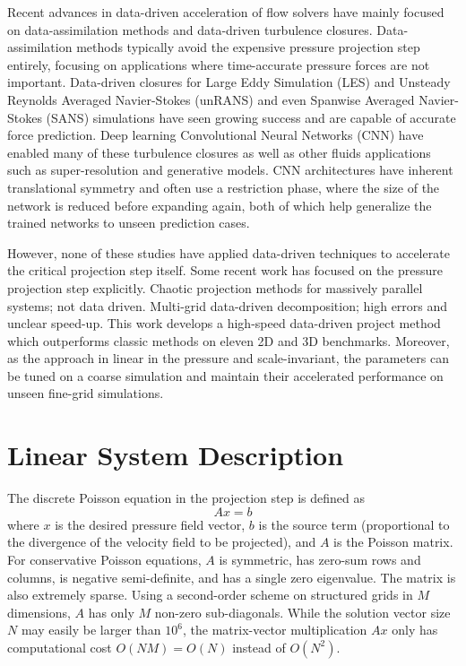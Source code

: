 \documentclass[review]{elsarticle}
\begin{document}
Recent advances in data-driven acceleration of flow solvers have mainly focused on data-assimilation methods and data-driven turbulence closures. Data-assimilation methods typically avoid the expensive pressure projection step entirely, focusing on applications where time-accurate pressure forces are not important. Data-driven closures for Large Eddy Simulation (LES) and Unsteady Reynolds Averaged Navier-Stokes (unRANS) and even Spanwise Averaged Navier-Stokes (SANS) simulations have seen growing success and are capable of accurate force prediction. Deep learning Convolutional Neural Networks (CNN) have enabled many of these turbulence closures as well as other fluids applications such as super-resolution and generative models. CNN architectures have inherent translational symmetry and often use a restriction phase, where the size of the network is reduced before expanding again, both of which help generalize the trained networks to unseen prediction cases. 

However, none of these studies have applied data-driven techniques to accelerate the critical projection step itself. Some recent work has focused on the pressure projection step explicitly. Chaotic projection methods for massively parallel systems; not data driven. Multi-grid data-driven decomposition; high errors and unclear speed-up. This work develops a high-speed data-driven project method which outperforms classic methods on eleven 2D and 3D benchmarks. Moreover, as the approach in linear in the pressure and scale-invariant, the parameters can be tuned on a coarse simulation and maintain their accelerated performance on unseen fine-grid simulations. 

\section{Linear System Description}

The discrete Poisson equation in the projection step is defined as
\begin{equation}\label{eq:axb}
    A x = b
\end{equation}
where $x$ is the desired pressure field vector, $b$ is the source term (proportional to the divergence of the velocity field to be projected), and $A$ is the Poisson matrix. For conservative Poisson equations, $A$ is symmetric, has zero-sum rows and columns, is negative semi-definite, and has a single zero eigenvalue. The matrix is also extremely sparse. Using a second-order scheme on structured grids in $M$ dimensions, $A$ has only $M$ non-zero sub-diagonals. While the solution vector size $N$ may easily be larger than $10^6$, the matrix-vector multiplication $Ax$ only has computational cost $O(NM)=O(N)$ instead of $O(N^2)$.
\end{document}
